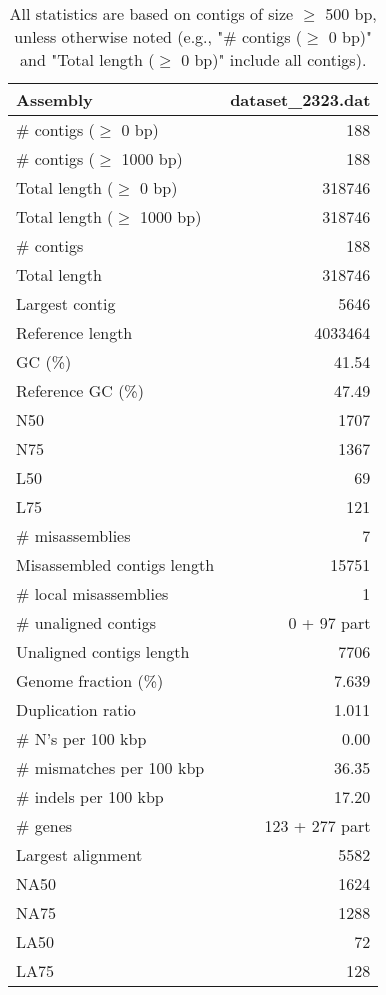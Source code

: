 \documentclass[12pt,a4paper]{article}
\begin{document}
\begin{table}[ht]
\begin{center}
\caption{All statistics are based on contigs of size $\geq$ 500 bp, unless otherwise noted (e.g., "\# contigs ($\geq$ 0 bp)" and "Total length ($\geq$ 0 bp)" include all contigs).}
\begin{tabular}{|l*{1}{|r}|}
\hline
Assembly & dataset\_2323.dat \\ \hline
\# contigs ($\geq$ 0 bp) & 188 \\ \hline
\# contigs ($\geq$ 1000 bp) & 188 \\ \hline
Total length ($\geq$ 0 bp) & 318746 \\ \hline
Total length ($\geq$ 1000 bp) & 318746 \\ \hline
\# contigs & 188 \\ \hline
Total length & 318746 \\ \hline
Largest contig & 5646 \\ \hline
Reference length & 4033464 \\ \hline
GC (\%) & 41.54 \\ \hline
Reference GC (\%) & 47.49 \\ \hline
N50 & 1707 \\ \hline
N75 & 1367 \\ \hline
L50 & 69 \\ \hline
L75 & 121 \\ \hline
\# misassemblies & 7 \\ \hline
Misassembled contigs length & 15751 \\ \hline
\# local misassemblies & 1 \\ \hline
\# unaligned contigs & 0 + 97 part \\ \hline
Unaligned contigs length & 7706 \\ \hline
Genome fraction (\%) & 7.639 \\ \hline
Duplication ratio & 1.011 \\ \hline
\# N's per 100 kbp & 0.00 \\ \hline
\# mismatches per 100 kbp & 36.35 \\ \hline
\# indels per 100 kbp & 17.20 \\ \hline
\# genes & 123 + 277 part \\ \hline
Largest alignment & 5582 \\ \hline
NA50 & 1624 \\ \hline
NA75 & 1288 \\ \hline
LA50 & 72 \\ \hline
LA75 & 128 \\ \hline
\end{tabular}
\end{center}
\end{table}
\end{document}

